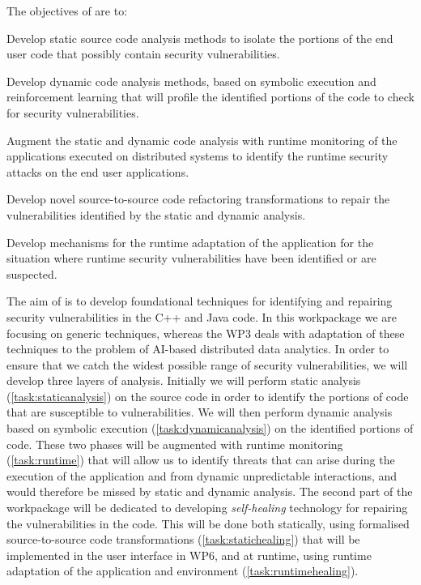 \addtocounter{wpno}{1}
\begin{Workpackage}{\thewpno}
\WPTitle{\wpname{\thewpno}}

\begin{WPObjectives}
The objectives of \theWP{} are to:
\begin{compactitem}
\item Develop static source code analysis methods to isolate the portions of the end user code that possibly contain security vulnerabilities.
\item Develop dynamic code analysis methods, based on symbolic execution and reinforcement learning that will profile the identified portions of the code to check for security vulnerabilities.
\item Augment the static and dynamic code analysis with runtime monitoring of the applications executed on distributed systems to identify the runtime security attacks on the end user applications.
\item Develop novel source-to-source code refactoring transformations to repair the vulnerabilities identified by the static and dynamic analysis.
\item Develop mechanisms for the runtime adaptation of the application for the situation where runtime security vulnerabilities have been identified or are suspected.
\end{compactitem}
\end{WPObjectives}

\begin{WPDescription}
The aim of \theWP{} is to develop foundational techniques for identifying and repairing security vulnerabilities in the C++ and Java code. In this workpackage we are focusing on generic techniques, whereas the WP3 deals with adaptation of these techniques to the problem of AI-based distributed data analytics. In order to ensure that we catch the widest possible range of security vulnerabilities, we will develop three layers of analysis. Initially we will perform static analysis (\ref{task:staticanalysis}) on the source code in order to identify the portions of code that are susceptible to vulnerabilities. We will then perform dynamic analysis based on symbolic execution (\ref{task:dynamicanalysis}) on the identified portions of code. These two phases will be augmented with runtime monitoring (\ref{task:runtime}) that will allow us to identify threats that can arise during the execution of the application and from dynamic unpredictable interactions, and would therefore be missed by static and dynamic analysis. The second part of the workpackage will be dedicated to developing \emph{self-healing} technology for repairing the vulnerabilities in the code. This will be done both statically, using formalised source-to-source code transformations ({\ref{task:statichealing}}) that will be implemented in the user interface in WP6, and at runtime, using runtime adaptation of the application and environment (\ref{task:runtimehealing}).
\end{WPDescription}


\end{Workpackage}
